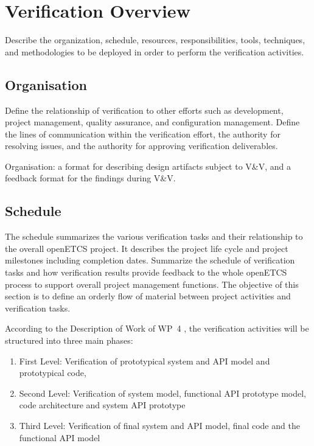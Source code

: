 
\section{Verification Overview}
\label{sec:verif-overv}
Describe the organization, schedule, resources, responsibilities,
tools, techniques, and methodologies to be deployed in order to
perform the verification activities.


\subsection{Organisation}
Define the relationship of verification to other efforts such as
development, project management, quality assurance, and configuration
management. Define the lines of communication within the verification
effort, the authority for resolving issues, and the authority for
approving verification deliverables.

Organisation: a format for describing design artifacts subject to V\&V,
  and a feedback format for the findings during V\&V.

\subsection{Schedule}
The schedule summarizes the various verification tasks and their
relationship to the overall openETCS project.  It describes the
project life cycle and project milestones including completion dates.
Summarize the schedule of verification tasks and how verification
results provide feedback to the whole openETCS process to support
overall project management functions.  The objective of this section
is to define an orderly flow of material between project activities
and verification tasks.

According to the Description of Work of WP~4 \cite{WP4DoW}, the verification
activities will be structured into three main phases: 
\begin{enumerate}
\item First Level: Verification of prototypical system and API model
  and prototypical code,
\item Second Level: Verification of system model, functional API
  prototype model, code architecture and system API prototype
\item Third Level: Verification of final system and API model, final
  code and the functional API model
\end{enumerate}







